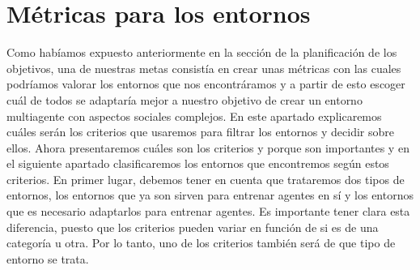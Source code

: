 \chapter{Métricas para los entornos}
Como habíamos expuesto anteriormente en la sección de la planificación de los objetivos, una de nuestras metas consistía en crear unas métricas con las cuales podríamos valorar los entornos que nos encontráramos y a partir de esto escoger cuál de todos se adaptaría mejor a nuestro objetivo de crear un entorno multiagente con aspectos sociales complejos. En este apartado explicaremos cuáles serán los criterios que usaremos para filtrar los entornos y decidir sobre ellos. Ahora presentaremos cuáles son los criterios y porque son importantes y en el siguiente apartado clasificaremos los entornos que encontremos según estos criterios. En primer lugar, debemos tener en cuenta que trataremos dos tipos de entornos, los entornos que ya son sirven para entrenar agentes en sí y los entornos que es necesario adaptarlos para entrenar agentes. Es importante tener clara esta diferencia, puesto que los criterios pueden variar en función de si es de una categoría u otra. Por lo tanto, uno de los criterios también será de que tipo de entorno se trata.  

